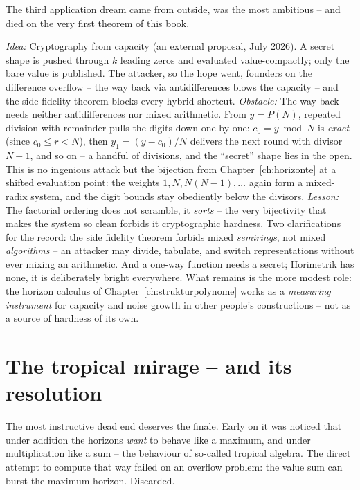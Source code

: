 The third application dream came from outside, was the most
ambitious -- and died on the very first theorem of this book.

\begin{sackgasse}
\emph{Idea:} Cryptography from capacity (an external proposal, July
2026). A secret shape is pushed through $k$ leading zeros and
evaluated value-compactly; only the bare value is published. The
attacker, so the hope went, founders on the difference overflow --
the way back via antidifferences blows the capacity -- and the side
fidelity theorem blocks every hybrid shortcut.
\emph{Obstacle:} The way back needs neither antidifferences nor
mixed arithmetic. From $y=P(N)$, repeated division with remainder
pulls the digits down one by one: $c_0=y\bmod N$ is \emph{exact}
(since $c_0\le r<N$), then $y_1=(y-c_0)/N$ delivers the next round
with divisor $N{-}1$, and so on -- a handful of divisions, and the
``secret'' shape lies in the open. This is no ingenious attack but
the bijection from Chapter~\ref{ch:horizonte} at a shifted
evaluation point: the weights $1,N,N(N{-}1),\ldots$ again form a
mixed-radix system, and the digit bounds stay obediently below the
divisors.
\emph{Lesson:} The factorial ordering does not scramble, it
\emph{sorts} -- the very bijectivity that makes the system so clean
forbids it cryptographic hardness. Two clarifications for the
record: the side fidelity theorem forbids mixed \emph{semirings},
not mixed \emph{algorithms} -- an attacker may divide, tabulate,
and switch representations without ever mixing an arithmetic. And a
one-way function needs a secret; Horimetrik has none, it is
deliberately bright everywhere. What remains is the more modest
role: the horizon calculus of
Chapter~\ref{ch:strukturpolynome} works as a \emph{measuring
instrument} for capacity and noise growth in other people's
constructions -- not as a source of hardness of its own.
\end{sackgasse}

\section{The tropical mirage -- and its resolution}

The most instructive dead end deserves the finale. Early on it was
noticed that under addition the horizons \emph{want} to behave like
a maximum, and under multiplication like a sum -- the behaviour of
so-called tropical algebra. The direct attempt to compute that way
failed on an overflow problem: the value sum can burst the maximum
horizon. Discarded.

